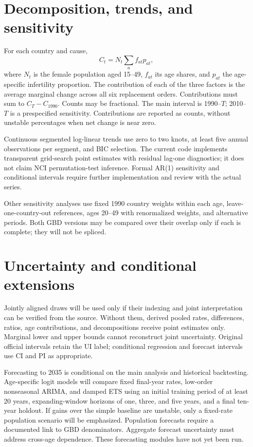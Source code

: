\documentclass[11pt,a4paper]{article}
\begin{document}
\section{Decomposition, trends, and sensitivity}
For each country and cause,
\[
 C_t=N_t\sum_a f_{at}p_{at},
\]
where $N_t$ is the female population aged 15--49, $f_{at}$ its age shares, and $p_{at}$ the age-specific infertility proportion. The contribution of each of the three factors is the average marginal change across all six replacement orders. Contributions must sum to $C_T-C_{1990}$. Counts may be fractional. The main interval is 1990--$T$; 2010--$T$ is a prespecified sensitivity. Contributions are reported as counts, without unstable percentages when net change is near zero.

Continuous segmented log-linear trends use zero to two knots, at least five annual observations per segment, and BIC selection. The current code implements transparent grid-search point estimates with residual lag-one diagnostics; it does not claim NCI permutation-test inference. Formal AR(1) sensitivity and conditional intervals require further implementation and review with the actual series.

Other sensitivity analyses use fixed 1990 country weights within each age, leave-one-country-out references, ages 20--49 with renormalized weights, and alternative periods. Both GBD versions may be compared over their overlap only if each is complete; they will not be spliced.

\section{Uncertainty and conditional extensions}
Jointly aligned draws will be used only if their indexing and joint interpretation can be verified from the source. Without them, derived pooled rates, differences, ratios, age contributions, and decompositions receive point estimates only. Marginal lower and upper bounds cannot reconstruct joint uncertainty. Original official intervals retain the UI label; conditional regression and forecast intervals use CI and PI as appropriate.

Forecasting to 2035 is conditional on the main analysis and historical backtesting. Age-specific logit models will compare fixed final-year rates, low-order nonseasonal ARIMA, and damped ETS using an initial training period of at least 20 years, expanding-window horizons of one, three, and five years, and a final ten-year holdout. If gains over the simple baseline are unstable, only a fixed-rate population scenario will be emphasized. Population forecasts require a documented link to GBD denominators. Aggregate forecast uncertainty must address cross-age dependence. These forecasting modules have not yet been run.
\end{document}
